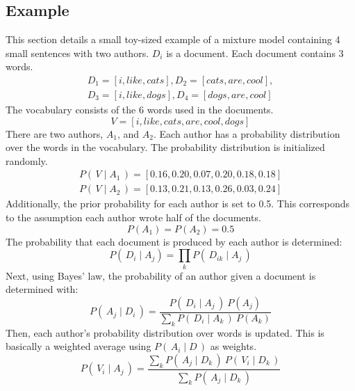 \subsection{Example}
This section details a small toy-sized example of a mixture model containing 4 small sentences with two authors.   $D_i$ is a document.  Each document contains 3 words.
\begin{equation}
\begin{split}
D_1 = [i,like,cats], D_2 = [cats,are,cool], \\
D_3 = [i,like,dogs], D_4 = [dogs,are,cool]
\end{split}
\end{equation}
The vocabulary consists of the 6 words used in the documents. 
\begin{equation}
V = [i,like,cats,are,cool,dogs]
\end{equation}
There are two authors, $A_1$, and $A_2$.  Each author has a probability distribution over the words in the vocabulary.  The probability distribution is initialized randomly.
\begin{equation}
\begin{split}
P(\,V \mid A_1\,) = [0.16, 0.20, 0.07, 0.20, 0.18, 0.18] \\
P(\,V \mid A_2\,) = [0.13, 0.21, 0.13, 0.26, 0.03, 0.24]
\end{split}
\end{equation}
Additionally, the prior probability for each author is set to 0.5.  This corresponds to the assumption each author wrote half of the documents.
\begin{equation}
P(A_1) = P(A_2) = 0.5
\end{equation}
The probability that each document is produced by each author is determined:
\begin{equation}
P(\,D_i \mid A_j) = \prod_{k} P(\,D_{ik} \mid A_j\,)
\label{eq:step1}
\end{equation}
Next, using Bayes' law, the probability of an author given a document is determined with:
\begin{equation}
P(\,A_j \mid D_i\,) = \frac{P(\,D_i \mid A_j\,)\ P(A_j)}{\sum_k P(\,D_i \mid A_k\,)\ P(A_k)}
\label{eq:step2}
\end{equation}
Then, each author's probability distribution over words is updated.  This is basically a weighted average using $P(\,A_i\mid D\,)$ as weights.
\begin{equation}
P(\,V_i \mid A_j\,) = \frac{\sum_{k} P(\,A_j \mid D_k\,)\ P(\,V_i \mid D_k\,)}{\sum_{k} P(\,A_j \mid D_k\,)}
\label{eq:step3}
\end{equation}
